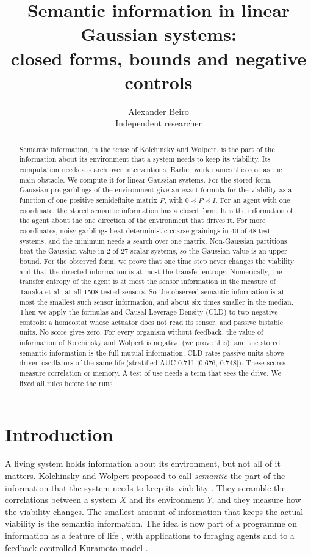 \documentclass[11pt]{article}
\title{Semantic information in linear Gaussian systems:\\
closed forms, bounds and negative controls}
\author{Alexander Beiro\\ \small Independent researcher}
\date{}
\begin{document}
\maketitle

\begin{abstract}
Semantic information, in the sense of Kolchinsky and Wolpert, is the part of the information about its environment
that a system needs to keep its viability. Its computation needs a search over interventions. Earlier work names this
cost as the main obstacle. We compute it for linear Gaussian systems. For the stored form,
Gaussian pre-garblings of the environment give an exact formula for the viability as a function of one positive
semidefinite matrix $P$, with $0\preceq P\preceq I$. For an agent with one coordinate, the stored semantic information
has a closed form. It is the information of the agent about the one direction of the environment that drives it. For
more coordinates, noisy garblings beat deterministic coarse-grainings in 40 of 48 test systems, and the minimum needs a
search over one matrix. Non-Gaussian partitions beat the Gaussian value in 2 of 27 scalar systems, so the Gaussian
value is an upper bound. For the observed form, we prove that one time step never changes the viability and that the
directed information is at most the transfer entropy. Numerically, the transfer entropy of the agent is at most the sensor
information in the measure of Tanaka et al.\ at all 1508 tested sensors. So the observed semantic information is at
most the smallest such sensor information, and about six times smaller in the median. Then we apply the formulas and Causal Leverage Density (CLD) to two negative controls: a homeostat whose
actuator does not read its sensor, and passive bistable units. No score gives zero. For every organism without feedback, the value of
information of Kolchinsky and Wolpert is negative (we prove this), and the stored semantic information is the full
mutual information. CLD rates passive units above driven oscillators of the same life (stratified AUC 0.711 [0.676,
0.748]). These scores measure correlation or memory. A test of use needs a term that sees the drive. We fixed
all rules before the runs.
\end{abstract}

\section{Introduction}
A living system holds information about its environment, but not all of it matters. Kolchinsky and Wolpert proposed
to call \emph{semantic} the part of the information that the system needs to keep its viability
\cite{KolchinskyWolpert18}. They scramble the correlations between a system $X$ and its environment $Y$, and they
measure how the viability changes. The smallest amount of information that keeps the actual viability is the semantic
information. The idea is now part of a programme on information as a feature of life \cite{Bartlett25}, with
applications to foraging agents \cite{Sowinski23} and to a feedback-controlled Kuramoto model
\cite{SowinskiFrankGhoshal24}.
\end{document}
